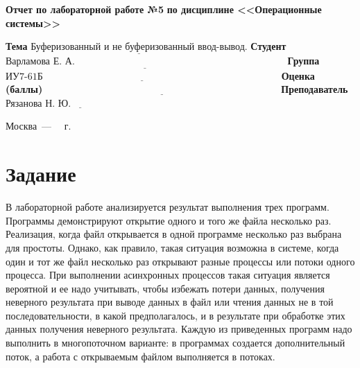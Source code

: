 \documentclass[12pt]{report}
\begin{document}
\begin{titlepage}
		\begin{center}
			\noindent\begin{minipage}{1.1\textwidth}\centering
				\Large\textbf{Отчет по лабораторной работе №5}\newline
				\textbf{по дисциплине <<Операционные системы>>}\newline\newline
			\end{minipage}
		\end{center}
		
		\noindent\textbf{Тема} $\underline{\text{Буферизованный и не буферизованный ввод-вывод.}}$\newline\newline
		\noindent\textbf{Студент} $\underline{\text{Варламова Е. А.~~~~~~~~~~~~~~~~~~~~~~~~~~~~~~~~~~~~~~~~~~~~~~~~~~~~~~~~~~~~~~~~~}}$\newline\newline
		\noindent\textbf{Группа} $\underline{\text{ИУ7-61Б~~~~~~~~~~~~~~~~~~~~~~~~~~~~~~~~~~~~~~~~~~~~~~~~~~~~~~~~~~~~~~~~~~~~~~~~~}}$\newline\newline
		\noindent\textbf{Оценка (баллы)} $\underline{\text{~~~~~~~~~~~~~~~~~~~~~~~~~~~~~~~~~~~~~~~~~~~~~~~~~~~~~~~~~~~~~~~~~~~~~~~~}}$\newline\newline
		\noindent\textbf{Преподаватель} $\underline{\text{Рязанова Н. Ю.~~~~~~~~~~~~~~~~~~~~~~~~~~}}$\newline\newline\newline
		
		\begin{center}
			\vfill
			Москва~---~\the\year
			~г.
		\end{center}
	\end{titlepage}
\section*{Задание}
В лабораторной работе анализируется результат выполнения трех программ. Программы демонстрируют открытие одного и того же файла несколько раз. Реализация, когда файл открывается в одной программе несколько раз выбрана для простоты. Однако, как правило, такая ситуация возможна в системе, когда один и тот же файл несколько раз открывают разные процессы или потоки одного процесса. При выполнении асинхронных процессов такая ситуация является вероятной и ее надо учитывать, чтобы избежать потери данных, получения неверного результата при выводе данных в файл или чтения данных не в той последовательности, в какой предполагалось, и в результате при обработке этих данных получения неверного результата.
Каждую из приведенных программ надо выполнить в многопоточном варианте: в программах создается дополнительный поток, а работа с открываемым файлом выполняется в потоках.
\end{document}
